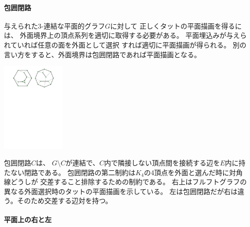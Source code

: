 \begin{paracol}{2}

\paragraph{包囲閉路}
与えられた$3$-連結な平面的グラフ$G$に対して
正しくタットの平面描画を得るには、
外面境界上の頂点系列を適切に取得する必要がある。
平面埋込みが与えられていれば任意の面を外面として選択%
すれば適切に平面描画が得られる。
別の言い方をすると、外面境界は包囲閉路であれば平面描画となる。

\switchcolumn
\centering
\includegraphics[width=0.24\textwidth]{figures/tutte_frucht_error.pdf}
\end{paracol}
包囲閉路$C$は、
$G\setminus C$が連結で、$C$内で隣接しない頂点間を接続する辺を$E$内に持たない閉路である。
包囲閉路の第二制約は$K_4$の4頂点を外面と選んだ時に対角線どうしが
交差すること排除するための制約である。
右上はフルフトグラフの異なる外面選択時のタットの平面描画を示している。
左は包囲閉路だが右は違う。そのため交差する辺対を持つ。




\paragraph{平面上の右と左}

